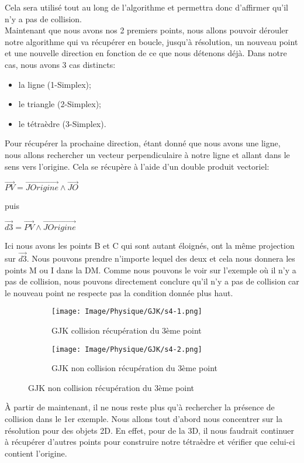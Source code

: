 \noindent Cela sera utilisé tout au long de l'algorithme et permettra donc d'affirmer qu'il n'y a pas de collision.\\

Maintenant que nous avons nos 2 premiers points, nous allons pouvoir dérouler notre algorithme qui va récupérer en boucle, jusqu'à résolution, un nouveau point et une nouvelle direction en fonction de ce que nous détenons déjà.
Dans notre cas, nous avons 3 cas distincts:
\begin{itemize}[label=-]
	\item la ligne (1-Simplex);
	\item le triangle (2-Simplex);
	\item le tétraèdre (3-Simplex).
\end{itemize}


Pour récupérer la prochaine direction, étant donné que nous avons une ligne, nous allons rechercher un vecteur perpendiculaire à notre ligne et allant dans le sens vers l'origine. Cela se récupère à l'aide d'un double produit vectoriel:\\

\centerline{$\vec{PV} = \vec{JOrigine} \land \vec{JO}$}
puis\\
\centerline{$\vec{d3} = \vec{PV} \land \vec{JOrigine}$}
\vfill
\noindent Ici nous avons les points B et C qui sont autant éloignés, ont la même projection sur $\vec{d3}$. Nous pouvons prendre n'importe lequel des deux et cela nous donnera les points M ou I dans la DM. Comme nous pouvons le voir sur l'exemple où il n'y a pas de collision, nous pouvons directement conclure qu'il n'y a pas de collision car le nouveau point ne respecte pas la condition donnée plus haut.

\begin{figure}[h!]
	\begin{subfigure}{0.4\linewidth}
		\texttt{[image: Image/Physique/GJK/s4-1.png]}
		\caption{GJK collision récupération du 3ème point}
		\label{fig:GJK collision récupération du 3ème point}
	\end{subfigure}
	\hfill
	\begin{subfigure}{0.4\linewidth}
		\texttt{[image: Image/Physique/GJK/s4-2.png]}
		\caption{GJK non collision récupération du 3ème point}
		\label{fig:GJK non collision récupération du 3ème point}
	\end{subfigure}
\end{figure}

À partir de maintenant, il ne nous reste plus qu'à rechercher la présence de collision dans le 1er exemple. Nous allons tout d'abord nous concentrer sur la résolution pour des objets 2D. En effet, pour de la 3D, il nous faudrait continuer à récupérer d'autres points pour construire notre tétraèdre et vérifier que celui-ci contient l'origine.\\

